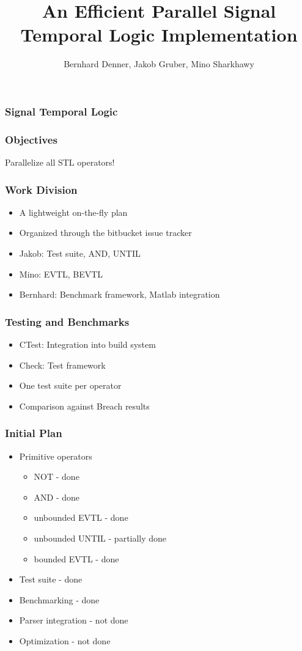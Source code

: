 \documentclass[notes=show]{beamer}
\title{An Efficient Parallel Signal Temporal Logic Implementation}
\author{
	Bernhard Denner,
	Jakob Gruber,
	Mino Sharkhawy
}
\begin{document}
\maketitle

\begin{frame}
\frametitle{Signal Temporal Logic}
\end{frame}

\begin{frame}
\frametitle{Objectives}
Parallelize all STL operators!
\end{frame}

\begin{frame}
\frametitle{Work Division}
\begin{itemize}
\item A lightweight on-the-fly plan
\item Organized through the bitbucket issue tracker
\item Jakob: Test suite, AND, UNTIL
\item Mino: EVTL, BEVTL
\item Bernhard: Benchmark framework, Matlab integration
\end{itemize}
\end{frame}

\begin{frame}
\frametitle{Testing and Benchmarks}
\begin{itemize}
\item CTest: Integration into build system
\item Check: Test framework
\item One test suite per operator
\item Comparison against Breach results
\end{itemize}
\end{frame}

\begin{frame}
\frametitle{Initial Plan}
\begin{itemize}
\item Primitive operators
\begin{itemize}
\item NOT - done
\item AND - done
\item unbounded EVTL - done
\item unbounded UNTIL - partially done
\item bounded EVTL - done
\end{itemize}
\item Test suite - done
\item Benchmarking - done
\item Parser integration - not done
\item Optimization - not done
\end{itemize}
\end{frame}
\end{document}
